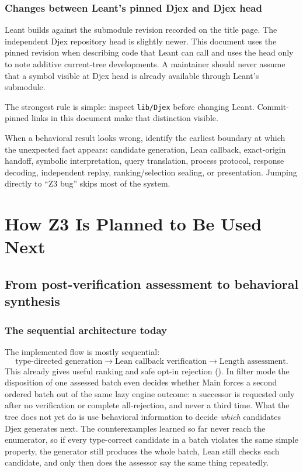 \documentclass[10pt,letterpaper,oneside]{report}
\newcommand{\code}[1]{\texttt{\detokenize{#1}}}
\newcommand{\filepath}[1]{\nolinkurl{#1}}
\begin{document}
\section{Changes between Leant's pinned Djex and Djex head}

Leant builds against the submodule revision recorded on the title page. The independent Djex repository head is slightly newer. This document uses the pinned revision when describing code that Leant can call and uses the head only to note additive current-tree developments. A maintainer should never assume that a symbol visible at Djex head is already available through Leant's submodule.

The strongest rule is simple: inspect \filepath{lib/Djex} before changing Leant. Commit-pinned links in this document make that distinction visible.

\begin{checkpoint}
When a behavioral result looks wrong, identify the earliest boundary at which the unexpected fact appears: candidate generation, Lean callback, exact-origin handoff, symbolic interpretation, query translation, process protocol, response decoding, independent replay, ranking/selection sealing, or presentation. Jumping directly to ``Z3 bug'' skips most of the system.
\end{checkpoint}

\part{How Z3 Is Planned to Be Used Next}

\chapter{From post-verification assessment to behavioral synthesis}
\label{chap:roadmap-overview}

\section{The sequential architecture today}

The implemented flow is mostly sequential:
\[
  \text{type-directed generation}
  \longrightarrow
  \text{Lean callback verification}
  \longrightarrow
  \text{Length assessment}.
\]
This already gives useful ranking and safe opt-in rejection (\code{--behavior-mode filter}). In filter mode the disposition of one assessed batch even decides whether Main forces a second ordered batch out of the same lazy engine outcome: a successor is requested only after no verification or complete all-rejection, and never a third time. What the tree does not yet do is use behavioral information to decide \emph{which} candidates Djex generates next. The counterexamples learned so far never reach the enumerator, so if every type-correct candidate in a batch violates the same simple property, the generator still produces the whole batch, Lean still checks each candidate, and only then does the assessor say the same thing repeatedly.
\end{document}
